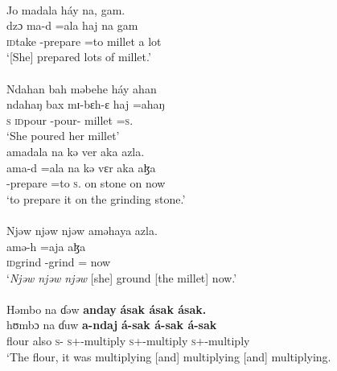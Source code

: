 \ea \label{ex:8:30}\\
Jo  madala  háy  na,  gam.\\     
\gll  dzɔ ma-d =ala haj na gam\\
      {\textsc{id}take}    {\NOM}-prepare  =to    millet   {\PSP}   {a lot}\\
\glt  ‘[She] prepared lots of millet.’\\
\medskip
{}\\
Ndahan  bah  məbehe  háy  ahan \\
\gll  ndahaŋ bax mɪ{}-bɛh-ɛ haj =ahaŋ\\
      \textsc{s} \textsc{id}pour {\NOM}{}-pour-{\CL}  millet  =\textsc{s}.{\POSS} \\
\glt  ‘She poured her millet’\\
\medskip
amadala  na  kə  ver  aka  azla.\\
\gll   ama-d =ala na kə vɛr aka aɮa\\
      {\DEP}-prepare  =to   \textsc{s}.{\DO}   on   stone  on      now\\
\glt  ‘to prepare it on the grinding stone.’\\

\medskip
{}\\
Njəw  njəw  njəw aməhaya  azla.\\  
 amə-h =aja aɮa\\
      {\textsc{id}grind}     {\DEP}-grind  ={\PLU}    now\\
\glt  ‘\textit{Njəw  njəw  njəw} [she]  ground [the millet] now.’ \\

\medskip
{}\\
Həmbo  na  ɗəw  \textbf{anday}  \textbf{ásak  ásak  ásak.}\\
\gll  hʊmbɔ na ɗuw \textbf{a-ndaj} \textbf{á-sak  á-sak  á-sak}\\
      flour  {\PSP}  also  \textsc{s}-{\PRG} {\textsc{s}+{\IFV}-multiply \textsc{s}+{\IFV}-multiply \textsc{s}+{\IFV}-multiply}\\
\glt  ‘The flour, it was multiplying [and] multiplying [and] multiplying.\\

